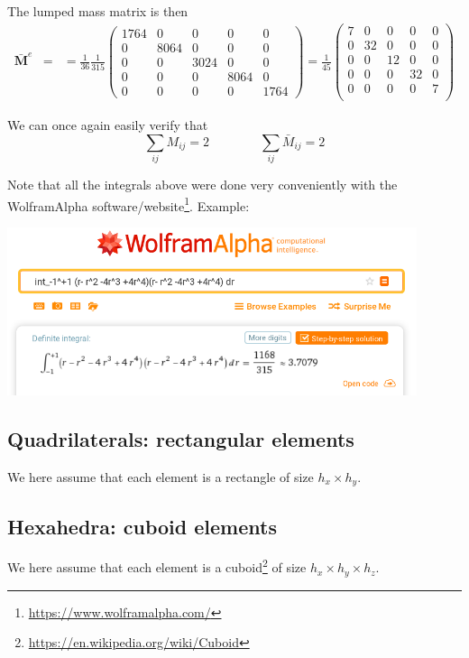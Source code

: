 The lumped mass matrix is then
\begin{eqnarray}
\bar{\bm M}^e 
&=&
=\frac{1}{36}
\frac{1}{315}
\left(
\begin{array}{ccccc}
1764 &0&0&0&0\\
0&8064 &0&0&0\\
0&0&3024 &0&0\\
0&0&0&8064 &0\\
0&0&0&0&1764 
\end{array}
\right)
=
\frac{1}{45}
\left(
\begin{array}{ccccc}
7 &0&0&0&0 \\
0&32 &0&0&0 \\
0&0&12  &0&0 \\
0&0&0&32   &0 \\
0&0&0&0&7      \\
\end{array}
\right)
\end{eqnarray}


We can once again easily verify that
\[
\sum_{ij} M_{ij} = 2
\qquad
\qquad
\sum_{ij} \bar{M}_{ij} = 2
\]


Note that all the integrals above were done very conveniently 
with the WolframAlpha software/website\footnote{\url{https://www.wolframalpha.com/}}.
Example:

\begin{center}
\includegraphics[width=12cm]{images/app_massmatrix/wolframalpha}
\end{center}







\subsection{Quadrilaterals: rectangular elements}

We here assume that each element is a rectangle of size $h_x \times h_y$. 




\subsection{Hexahedra: cuboid elements}

We here assume that each element is a cuboid\footnote{\url{https://en.wikipedia.org/wiki/Cuboid}} 
of size $h_x \times h_y \times h_z$. 









